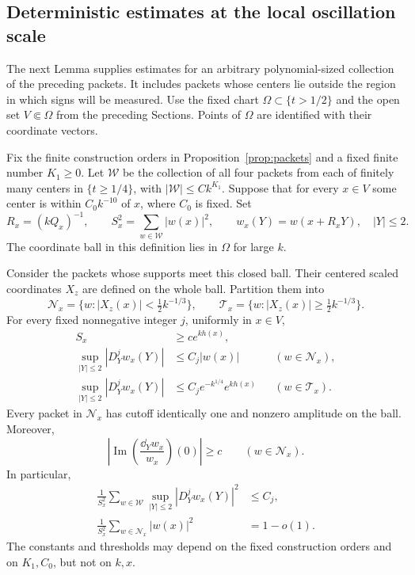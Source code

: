 \subsection{Deterministic estimates at the local oscillation scale}

The next Lemma supplies estimates for an arbitrary polynomial-sized
collection of the preceding packets. It includes packets whose
centers lie outside the region in which signs will be measured.
Use the fixed chart \(\Omega\subset\{t>1/2\}\) and the open set
\(V\Subset\Omega\) from the preceding Sections. Points of \(\Omega\)
are identified with their coordinate vectors.

\begin{lemma}\label{lem:scaled-packets}
Fix the finite construction orders in Proposition~\ref{prop:packets}
and a fixed finite number \(K_1\ge0\). Let \(\mathcal W\) be the collection of
all four packets from each of finitely many centers in
\(\{t\ge1/4\}\), with \(|\mathcal W|\le Ck^{K_1}\).
Suppose that for every \(x\in V\) some center is within
\(C_0k^{-10}\) of \(x\), where \(C_0\) is fixed. Set
\[
 R_x=(kQ_x)^{-1},\qquad
 S_x^2=\sum_{w\in\mathcal W}|w(x)|^2,\qquad
 w_x(Y)=w(x+R_xY),\quad |Y|\le2.
\]
The coordinate ball in this definition lies in \(\Omega\) for large
\(k\).

Consider the packets whose supports meet this closed ball. Their
centered scaled coordinates \(X_z\) are defined on the whole ball.
Partition them into
\[
 \mathcal N_x=\{w:|X_z(x)|<\tfrac12k^{-1/3}\},\qquad
 \mathcal T_x=\{w:|X_z(x)|\ge\tfrac12k^{-1/3}\}.
\]
For every fixed nonnegative integer \(j\), uniformly in \(x\in V\),
\begin{equation}\label{eq:scaled-packet-bounds}
 \begin{aligned}
 S_x&\ge c e^{kh(x)},\\
 \sup_{|Y|\le2}|D_Y^j w_x(Y)|
     &\le C_j|w(x)| &&(w\in\mathcal N_x),\\
 \sup_{|Y|\le2}|D_Y^j w_x(Y)|
     &\le C_j e^{-k^{1/4}}e^{kh(x)}
                                  &&(w\in\mathcal T_x).
 \end{aligned}
\end{equation}
Every packet in \(\mathcal N_x\) has cutoff identically one and
nonzero amplitude on the ball. Moreover,
\begin{equation}\label{eq:imaginary-gradient}
 \left|\operatorname{Im}
   \left(\frac{\dd_Yw_x}{w_x}\right)(0)\right|\ge c
 \qquad(w\in\mathcal N_x).
\end{equation}
In particular,
\begin{equation}\label{eq:waves-square-sums}
 \begin{aligned}
 \frac1{S_x^2}\sum_{w\in\mathcal W}
   \sup_{|Y|\le2}|D_Y^jw_x(Y)|^2&\le C_j,\\
 \frac1{S_x^2}\sum_{w\in\mathcal N_x}|w(x)|^2&=1-o(1).
 \end{aligned}
\end{equation}
The constants and thresholds may depend on the fixed construction
orders and on \(K_1,C_0\), but not on \(k,x\).
\end{lemma}

